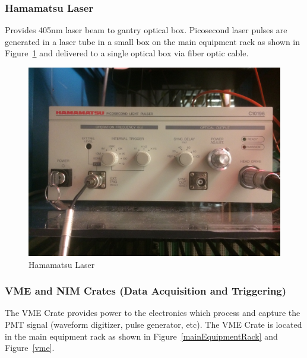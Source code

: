 \documentclass[twoside,letterpaper]{refart}
\newcommand{\picwidth}{0.7 \textwidth}
\begin{document}
\subsubsection{Hamamatsu Laser}

Provides 405nm laser beam to gantry optical box. Picosecond laser pulses are generated in a laser tube in a small box on the main equipment rack as shown in Figure~\ref{laser} and delivered to a single optical box via fiber optic cable.

\FloatBarrier

\begin{figure}[!htpb]\centering	
	\includegraphics[width=\picwidth]{images/laser}
	\caption{Hamamatsu Laser\label{laser}}
\end{figure}

\FloatBarrier

\clearpage

\subsubsection{VME and NIM Crates (Data Acquisition and Triggering)}

The VME Crate provides power to the electronics which process and capture the PMT signal (waveform digitizer, pulse generator, etc). The VME Crate is located in the main equipment rack as shown in Figure~\ref{mainEquipmentRack} and Figure~\ref{vme}.

\FloatBarrier
\end{document}

